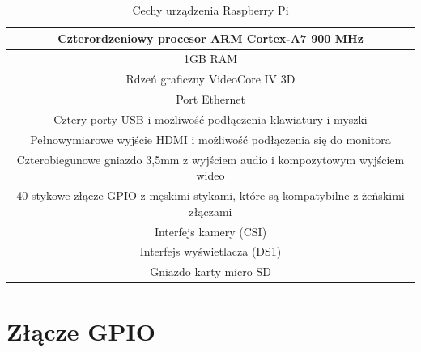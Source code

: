 \begin{table}
\centering
\caption{Cechy urządzenia Raspberry Pi}
\begin{tabular}{|c|}
\hline
Czterordzeniowy procesor ARM Cortex-A7 900 MHz \\
\hline
1GB RAM \\
\hline
Rdzeń graficzny VideoCore IV 3D \\
\hline
Port Ethernet \\
\hline
Cztery porty USB i możliwość podłączenia klawiatury i myszki \\
\hline
Pełnowymiarowe wyjście HDMI i możliwość podłączenia się do monitora \\
\hline
Czterobiegunowe gniazdo 3,5mm z wyjściem audio i kompozytowym wyjściem wideo \\
\hline
40 stykowe złącze GPIO z męskimi stykami, które są kompatybilne z żeńskimi złączami \\
\hline
Interfejs kamery (CSI) \\
\hline
Interfejs wyświetlacza (DS1) \\
\hline
Gniazdo karty micro SD \\
\hline
\end{tabular}
\end{table}



\section{Złącze GPIO}


